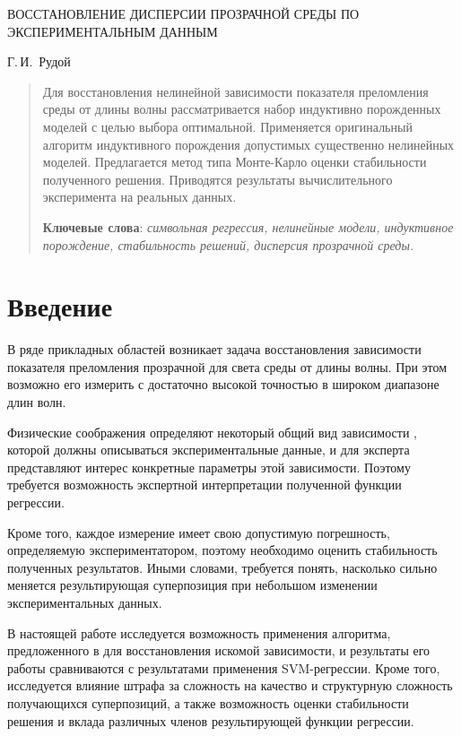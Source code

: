 \documentclass[12pt,a4paper]{article}
\begin{document}
\lstset{language=C++}

\begin{center}
  ВОССТАНОВЛЕНИЕ ДИСПЕРСИИ ПРОЗРАЧНОЙ СРЕДЫ ПО ЭКСПЕРИМЕНТАЛЬНЫМ ДАННЫМ

  \bigskip
  Г.\,И.~Рудой
\end{center}

\begin{abstract}
  Для восстановления нелинейной зависимости показателя преломления среды от длины
  волны рассматривается набор индуктивно порожденных моделей с целью выбора оптимальной.
  Применяется оригинальный алгоритм индуктивного порождения допустимых существенно
  нелинейных моделей. Предлагается метод типа Монте-Карло оценки стабильности полученного решения.
  Приводятся результаты вычислительного эксперимента на реальных данных.

  \bigskip
  \textbf{Ключевые слова}: \emph{символьная регрессия, нелинейные модели, индуктивное порождение,
	стабильность решений, дисперсия прозрачной среды.}
\end{abstract}

\section{Введение}

В ряде прикладных областей возникает задача восстановления зависимости показателя
преломления прозрачной для света среды от длины волны.
При этом возможно его измерить с достаточно высокой точностью в широком диапазоне длин волн.

Физические соображения определяют некоторый общий вид зависимости \cite{Sivukhin05,Serova11},
которой должны описываться экспериментальные данные, и для эксперта представляют
интерес конкретные параметры этой зависимости. Поэтому требуется возможность
экспертной интерпретации полученной функции регрессии.

Кроме того, каждое измерение имеет свою допустимую погрешность, определяемую
экспериментатором, поэтому необходимо оценить стабильность полученных результатов.
Иными словами, требуется понять, насколько сильно меняется результирующая суперпозиция
при небольшом изменении экспериментальных данных.

В настоящей работе исследуется возможность применения алгоритма, предложенного в
\cite{Rudoy13} для восстановления искомой зависимости, и результаты его работы сравниваются
с результатами применения SVM-регрессии. Кроме того, исследуется влияние штрафа за
сложность на качество и структурную сложность получающихся суперпозиций, а также
возможность оценки стабильности решения и вклада различных членов результирующей
функции регрессии.
\end{document}
